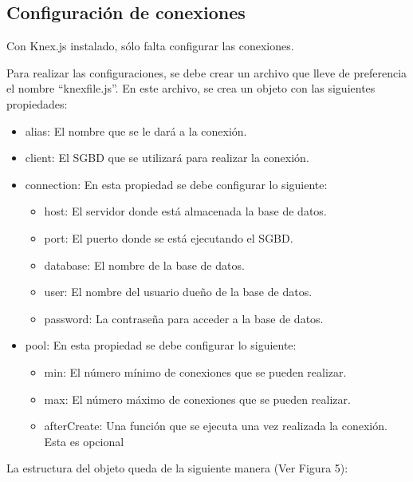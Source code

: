 \subsection{Configuración de conexiones}
Con Knex.js instalado, sólo falta configurar las conexiones.

Para realizar las configuraciones, se debe crear un archivo que lleve de preferencia el nombre ``knexfile.js''. En este archivo, se crea un objeto con las siguientes propiedades:
    \begin{itemize}
        \item alias: El nombre que se le dará a la conexión.
        \item client: El SGBD que se utilizará para realizar la conexión.
        \item connection: En esta propiedad se debe configurar lo siguiente:
            \begin{itemize}
                \item host: El servidor donde está almacenada la base de datos.
                \item port: El puerto donde se está ejecutando el SGBD.
                \item database: El nombre de la base de datos.
                \item user: El nombre del usuario dueño de la base de datos.
                \item password: La contraseña para acceder a la base de datos.
            \end{itemize}
        \item pool: En esta propiedad se debe configurar lo siguiente:
            \begin{itemize}
                \item min: El número mínimo de conexiones que se pueden realizar.
                \item max: El número máximo de conexiones que se pueden realizar.
                \item afterCreate: Una función que se ejecuta una vez realizada la conexión. Esta es opcional
            \end{itemize}
    \end{itemize}
La estructura del objeto queda de la siguiente manera (Ver Figura 5):
